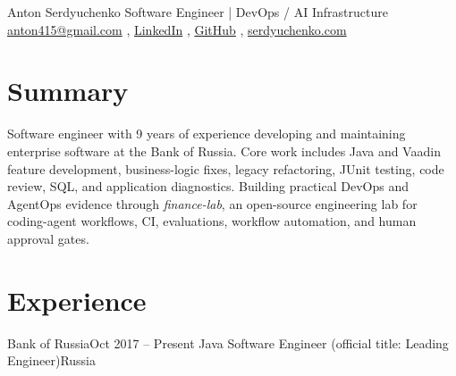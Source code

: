 \documentclass[letterpaper,10pt]{article}
\begin{document}
\resumeHeader
  {Anton Serdyuchenko}
  {Software Engineer | DevOps / AI Infrastructure}
  {\href{mailto:anton415@gmail.com}{anton415@gmail.com} \sep
   \href{https://www.linkedin.com/in/antonserdyuchenko}{LinkedIn} \sep
   \href{https://github.com/anton415}{GitHub} \sep
   \href{https://serdyuchenko.com}{serdyuchenko.com}}

\section{Summary}
\small
Software engineer with 9 years of experience developing and maintaining enterprise software at the Bank of Russia. Core work includes Java and Vaadin feature development, business-logic fixes, legacy refactoring, JUnit testing, code review, SQL, and application diagnostics. Building practical DevOps and AgentOps evidence through \textit{finance-lab}, an open-source engineering lab for coding-agent workflows, CI, evaluations, workflow automation, and human approval gates.

\section{Experience}
\resumeSubHeadingListStart
  \resumeSubheading
    {Bank of Russia}{Oct 2017 -- Present}
    {Java Software Engineer (official title: Leading Engineer)}{Russia}
    \resumeItemListStart
    \resumeItemListEnd
\resumeSubHeadingListEnd
\end{document}
